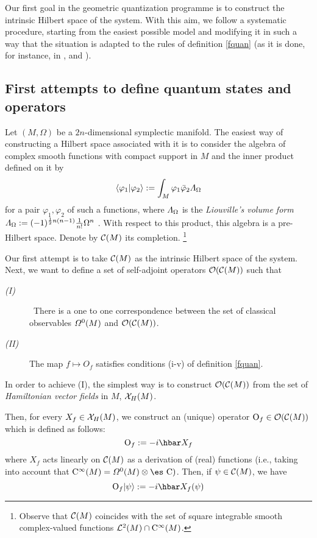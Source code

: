 \documentclass[12pt]{article}
\theoremstyle{plain}
\def\beq{\begin{equation}}
\def\eeq{\end{equation}}
\def\dst{\(}
\def\C{{\cal C}}
\def\sta{|\psi \rangle }
\def\Op{{\rm O}}
\def\Complex{\mbox{\es C}}
\def\Cinfty{{\rm C}^\infty}
\def\LF{{\mit\Lambda}_{\Omega}}
\begin{document}
Our first goal in the geometric quantization programme
is to construct the intrinsic Hilbert space of the system.
With this aim, we follow a systematic procedure,
starting from the easiest possible model and modifying it in such a way
that
the situation is adapted to the rules of definition
\ref{fquan} (as it is done, for instance,
in \cite{Ki-76}, \cite{SW-76} and \cite{Wo-80}).



\subsection{First attempts to define quantum states and operators}


Let $(M,\Omega )$
be a $2n$-dimensional symplectic manifold.
The easiest way of constructing
a Hilbert space associated with it is to consider the algebra
of complex smooth functions with compact support in $M$
and the inner product defined on it by
\beq
\langle \varphi_1 |\varphi_2\rangle  := \int_M \varphi_1 \bar \varphi_2
\LF
\label{inprod}
\eeq
for a pair $\varphi_1, \varphi_2$ of such a functions,
where $\LF$ is the {\it Liouville's volume form}
\dst \LF := (-1)^{\frac{1}{2}n(n-1)}\frac{1}{n!}\Omega^n\) .
With respect to this product, this algebra is a pre-Hilbert space.
Denote by $\C (M)$ its completion.%
\footnote{Observe that $\C (M)$ coincides with the set of
square integrable smooth complex-valued functions
${\cal L}^2(M) \cap \Cinfty (M)$.}

Our first attempt is to take $\C (M)$
as the intrinsic Hilbert space of the system.
Next, we want to define a set of self-adjoint operators ${\cal O}(\C
(M))$
such that
\begin{description}
\item[{\it (I)}] \
There is a one to one correspondence between the set of classical
observables
${\mit\Omega}^0(M)$ and ${\cal O}(\C (M))$.
\item[{\it (II)}]
The map $f \mapsto O_f$ satisfies conditions (i-v) of definition
\ref{fquan}.
\end{description}

In order to achieve (I), the simplest way is to construct ${\cal O}(\C
(M))$
from the set of {\it Hamiltonian vector fields} in $M$, ${\cal X}_H(M)$.

Then, for every $X_f \in {\cal X}_H(M)$, we construct an (unique)
operator
$\Op_f \in {\cal O}(\C (M))$ which is defined as follows:
$$
\Op_f := -i\hbar X_f
$$
where $X_f$ acts linearly on $\C (M)$ as a derivation of (real)
functions
 (i.e., taking into account that
 $\Cinfty (M) = {\mit\Omega}^0(M) \otimes\Complex)$.
Then, if $\psi \in \C (M)$, we have
$$
\Op_f\sta := -i\hbar X_f(\psi)
$$
\end{document}
